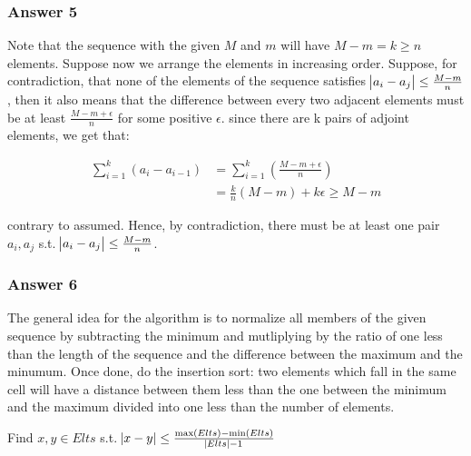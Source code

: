 \documentclass[11pt]{article}
\begin{document}
\subsubsection{Answer 5}
\label{sec:orgheadline6}
Note that the sequence with the given \(M\) and \(m\) will have \(M - m = k \geq
    n\) elements.  Suppose now we arrange the elements in increasing order.
Suppose, for contradiction, that none of the elements of the sequence
satisfies \(\abs{a_i - a_j} \leq \frac{M - m}{n}\), then it also means that
the difference between every two adjacent elements must be at least
\(\frac{M - m + \epsilon}{n}\) for some positive \(\epsilon\).  since there are
k pairs of adjoint elements, we get that:

\begin{align*}
  \sum_{i=1}^k\left(a_i - a_{i-1}\right) &= \sum_{i=1}^k\left(\frac{M - m + \epsilon}{n}\right) \\
  &= \frac{k}{n}\left(M - m\right) + k \epsilon \geq M - m
\end{align*}

contrary to assumed.  Hence, by contradiction, there must be at least one
pair \(a_i, a_j\) s.t. \(\abs{a_i - a_j} \leq \frac{M - m}{n}\).

\subsubsection{Answer 6}
\label{sec:orgheadline7}
The general idea for the algorithm is to normalize all members of the given
sequence by subtracting the minimum and mutliplying by the ratio of one less
than the length of the sequence and the difference between the maximum and
the minumum.  Once done, do the insertion sort: two elements which fall in
the same cell will have a distance between them less than the one between
the minimum and the maximum divided into one less than the number of elements.

\begin{algorithm}
  \caption{Find $x, y \in Elts$ s.t. $\abs{x - y} \leq \frac{\max(Elts) - \min(Elts)}{\abs{Elts} - 1}$}
  \begin{algorithmic}
    \State {}
    \State {}
    \State {}
    \State {}
     \Do
     \Then
    \Else
    \EndIf
    \EndFor
    \EndProcedure
  \end{algorithmic}
\end{algorithm}
\end{document}
